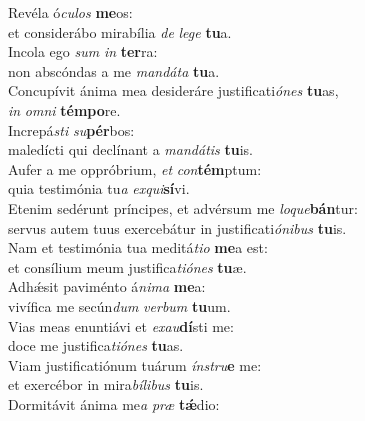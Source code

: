 \evenverse Revéla ó\textit{cu}\textit{los} \textbf{me}os:~\*\\
\evenverse et considerábo mirabília \textit{de} \textit{le}\textit{ge} \textbf{tu}a.\\
\oddverse Incola ego \textit{sum} \textit{in} \textbf{ter}ra:~\*\\
\oddverse non abscóndas a me \textit{man}\textit{dá}\textit{ta} \textbf{tu}a.\\
\evenverse Concupívit ánima mea desideráre justificati\textit{ó}\textit{nes} \textbf{tu}as,~\*\\
\evenverse \textit{in} \textit{om}\textit{ni} \textbf{tém}\textbf{po}re.\\
\oddverse Increpá\textit{sti} \textit{su}\textbf{pér}bos:~\*\\
\oddverse maledícti qui declínant a \textit{man}\textit{dá}\textit{tis} \textbf{tu}is.\\
\evenverse Aufer a me oppróbrium, \textit{et} \textit{con}\textbf{tém}ptum:~\*\\
\evenverse quia testimónia tu\textit{a} \textit{ex}\textit{qui}\textbf{sí}vi.\\
\oddverse Etenim sedérunt príncipes, et advérsum me \textit{lo}\textit{que}\textbf{bán}tur:~\*\\
\oddverse servus autem tuus exercebátur in justificati\textit{ó}\textit{ni}\textit{bus} \textbf{tu}is.\\
\evenverse Nam et testimónia tua meditá\textit{ti}\textit{o} \textbf{me}a est:~\*\\
\evenverse et consílium meum justifica\textit{ti}\textit{ó}\textit{nes} \textbf{tu}æ.\\
\oddverse Adhǽsit paviménto á\textit{ni}\textit{ma} \textbf{me}a:~\*\\
\oddverse vivífica me secún\textit{dum} \textit{ver}\textit{bum} \textbf{tu}um.\\
\evenverse Vias meas enuntiávi et \textit{e}\textit{xau}\textbf{dí}sti me:~\*\\
\evenverse doce me justifica\textit{ti}\textit{ó}\textit{nes} \textbf{tu}as.\\
\oddverse Viam justificatiónum tuárum \textit{ín}\textit{stru}\textbf{e} me:~\*\\
\oddverse et exercébor in mira\textit{bí}\textit{li}\textit{bus} \textbf{tu}is.\\
\evenverse Dormitávit ánima me\textit{a} \textit{præ} \textbf{tǽ}dio:~\*\\

